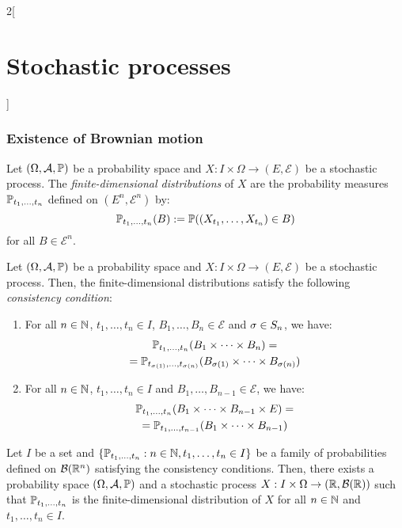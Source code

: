\documentclass[../../../main_math.tex]{subfiles}
\begin{document}
\begin{multicols}{2}[\section{Stochastic processes}]
  \subsubsection{Existence of Brownian motion}
  \begin{definition}
    Let $(\Omega, \mathcal{A}, \Prob)$ be a probability space and $X: I\times\Omega\rightarrow (E,\mathcal{E})$ be a stochastic process. The \emph{finite-dimensional distributions} of $X$ are the probability measures $\Prob_{t_1,\dots,t_n}$ defined on $(E^n,\mathcal{E}^n)$ by:
    $$
      \Prob_{t_1,\dots,t_n}(B):=\Prob((X_{t_1},\dots,X_{t_n})\in B)
    $$
    for all $B\in\mathcal{E}^n$.
  \end{definition}
  \begin{lemma}
    Let $(\Omega, \mathcal{A}, \Prob)$ be a probability space and $X: I\times\Omega\rightarrow (E,\mathcal{E})$ be a stochastic process. Then, the finite-dimensional distributions satisfy the following \emph{consistency condition}:
    \begin{enumerate}
      \item For all $n\in\NN$, $t_1,\dots,t_n\in I$, $B_1,\dots,B_n\in\mathcal{E}$ and $\sigma\in\S_n$, we have:
            \begin{multline*}
              \Prob_{t_1,\dots,t_n}(B_1\times\dots\times B_n)=\\=\Prob_{t_{\sigma(1)},\dots,t_{\sigma(n)}}(B_{\sigma(1)}\times\dots\times B_{\sigma(n)})
            \end{multline*}
      \item  For all $n\in\NN$, $t_1,\dots,t_n\in I$ and $B_1,\dots,B_{n-1}\in\mathcal{E}$, we have:
            \begin{multline*}
              \Prob_{t_1,\dots,t_n}(B_1\times\dots\times B_{n-1}\times E)=\\=\Prob_{t_1,\dots,t_{n-1}}(B_1\times\dots\times B_{n-1})
            \end{multline*}
    \end{enumerate}
  \end{lemma}
  \begin{theorem}
    Let $I$ be a set and $\{\Prob_{t_1,\dots,t_n}:n\in\NN,t_1,\ldots,t_n\in I\}$ be a family of probabilities defined on $\mathcal{B}(\RR^n)$ satisfying the consistency conditions. Then, there exists a probability space $(\Omega, \mathcal{A}, \Prob)$ and a stochastic process $X: I\times\Omega\rightarrow (\RR,\mathcal{B}(\RR))$ such that $\Prob_{t_1,\dots,t_n}$ is the finite-dimensional distribution of $X$ for all $n\in\NN$ and $t_1,\dots,t_n\in I$.
  \end{theorem}
\end{multicols}
\end{document}
